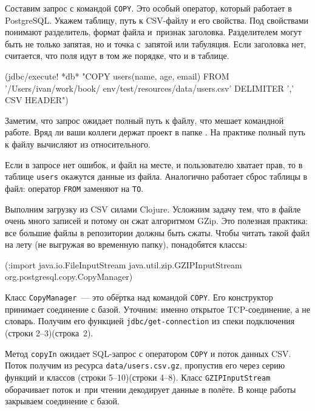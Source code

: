 
Составим запрос с командой \verb|COPY|. Это особый оператор, который работает в
PostgreSQL. Укажем таблицу, путь к CSV-файлу и его свойства. Под свойствами
понимают разделитель, формат файла и~признак заголовка. Разделителем могут быть
не только запятая, но и точка с~запятой или табуляция. Если заголовка нет,
считается, что поля идут в том же порядке, что и в таблице.

\pagebreaklarge

\begin{english}
  \begin{clojure}
(jdbc/execute! *db*
 "COPY users(name, age, email)
  FROM '/Users/ivan/work/book/
        env/test/resources/data/users.csv'
  DELIMITER ',' CSV HEADER")
  \end{clojure}
\end{english}

Заметим, что запрос ожидает полный путь к файлу, что мешает командной
работе. Вряд ли ваши коллеги держат проект в папке
. На практике полный путь к файлу вычисляют из
относительного.

Если в запросе нет ошибок, и файл на месте, и пользователю хватает прав, то в
таблице \verb|users| окажутся данные из файла. Аналогично работает сброс таблицы
в файл: оператор \verb|FROM| заменяют на \verb|TO|.


Выполним загрузку из CSV силами Clojure. Усложним задачу тем, что в файле очень
много записей и потому он сжат алгоритмом GZip. Это полезная практика: все
большие файлы в репозитории должны быть сжаты. Чтобы читать такой файл на лету
(не выгружая во временную папку), понадобятся классы:

\begin{english}
  \begin{clojure}
(:import java.io.FileInputStream
         java.util.zip.GZIPInputStream
         org.postgresql.copy.CopyManager)
  \end{clojure}
\end{english}

Класс \verb|CopyManager|~--- это обёртка над командой \verb|COPY|. Его
конструктор принимает соединение с базой. Уточним: именно открытое
TCP-соединение, а не словарь. Получим его функцией \verb|jdbc/get-connection| из
спеки подключения \ifnarrow(строки 2--3)\else(строка~2)\fi.

Метод \verb|copyIn| ожидает SQL-запрос с оператором \verb|COPY| и поток данных
CSV. Поток получим из ресурса \verb|data/users.csv.gz|, пропустив его через
серию функций и классов \ifnarrow(строки 5--10)\else(строки
4--8)\fi. Класс \verb|GZIPInputStream| оборачивает поток и~при чтении декодирует
данные в полёте.  В конце работы закрываем соединение с базой.

